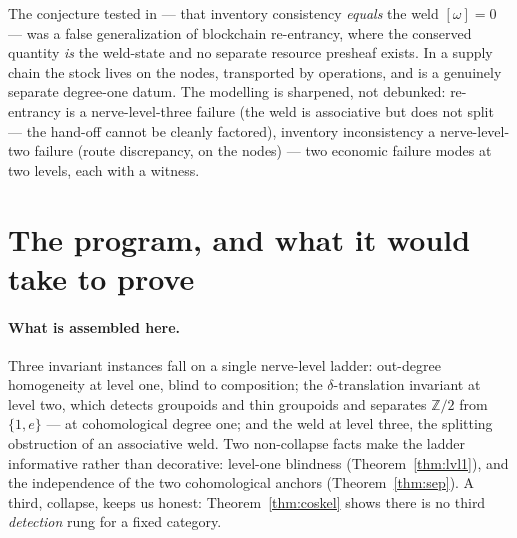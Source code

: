 \documentclass[11pt]{article}
\theoremstyle{definition}
\newcommand{\Z}{\mathbb{Z}}
\begin{document}
The conjecture tested in \cite{MacBethSupplyChain} --- that inventory consistency \emph{equals} the
weld $[\omega]=0$ --- was a false generalization of blockchain re-entrancy, where the conserved
quantity \emph{is} the weld-state and no separate resource presheaf exists. In a supply chain the
stock lives on the nodes, transported by operations, and is a genuinely separate degree-one datum. The
modelling is sharpened, not debunked: re-entrancy is a nerve-level-three failure (the weld is
associative but does not split --- the hand-off cannot be cleanly factored), inventory inconsistency a
nerve-level-two failure (route discrepancy, on the nodes) --- two economic failure modes at two levels,
each with a witness.

\section{The program, and what it would take to prove}\label{sec:program}

\paragraph{What is assembled here.}
Three invariant instances fall on a single nerve-level ladder: out-degree homogeneity at level one,
blind to composition; the $\delta$-translation invariant at level two, which detects groupoids and
thin groupoids and separates $\Z/2$ from $\{1,e\}$ --- at cohomological degree one; and the weld at
level three, the splitting obstruction of an associative weld. Two non-collapse facts make the ladder informative rather
than decorative: level-one blindness (Theorem~\ref{thm:lvl1}), and the independence of the two
cohomological anchors (Theorem~\ref{thm:sep}). A third, collapse, keeps us honest:
Theorem~\ref{thm:coskel} shows there is no third \emph{detection} rung for a fixed category.
\end{document}
